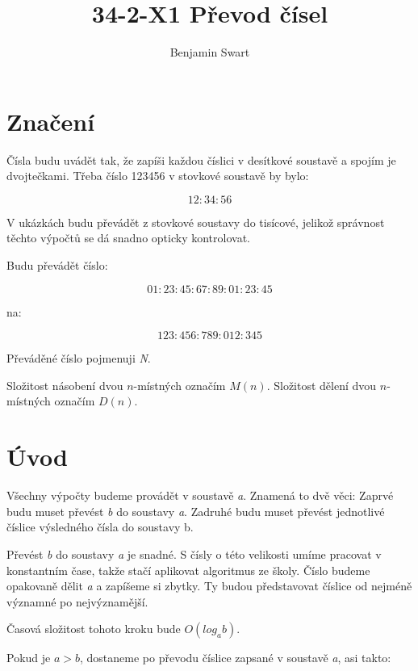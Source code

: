 \documentclass{article}
\title{34-2-X1 Převod čísel}
\author{Benjamin Swart}
\begin{document}
\maketitle

\section*{Značení}

Čísla budu uvádět tak, že zapíši každou číslici v desítkové soustavě a spojím je dvojtečkami. Třeba číslo 123456 v stovkové soustavě by bylo:

\begin{equation*}
    12:34:56
\end{equation*}

V ukázkách budu převádět z stovkové soustavy do tisícové, jelikož správnost těchto výpočtů se dá snadno opticky kontrolovat.

Budu převádět číslo:

\begin{equation*}
    01:23:45:67:89:01:23:45
\end{equation*}

na:

\begin{equation*}
    123:456:789:012:345
\end{equation*}

Převáděné číslo pojmenuji \emph{N}.

Složitost násobení dvou \(n\)-místných označím \(M(n)\). Složitost dělení dvou \(n\)-místných označím \(D(n)\).

\section*{Úvod}

Všechny výpočty budeme provádět v soustavě \emph{a}.
Znamená to dvě věci: Zaprvé budu muset převést \emph{b} do soustavy \emph{a}. Zadruhé budu muset převést jednotlivé číslice výsledného čísla do soustavy b.

Převést \emph{b} do soustavy \emph{a} je snadné. S čísly o této velikosti umíme pracovat v konstantním čase, takže stačí aplikovat algoritmus ze školy. Číslo budeme opakovaně dělit \emph{a} a zapíšeme si zbytky. Ty budou představovat číslice od nejméně významné po nejvýznamější.

Časová složitost tohoto kroku bude \(O(log_a b)\).

Pokud je \(a > b\), dostaneme po převodu číslice zapsané v soustavě \emph{a}, asi takto:
\end{document}
